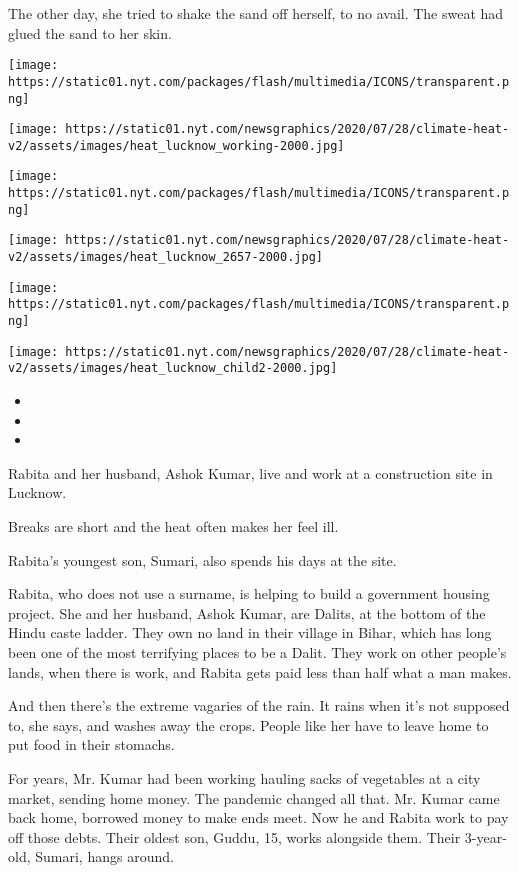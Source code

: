 The other day, she tried to shake the sand off herself, to no avail. The
sweat had glued the sand to her skin.

\texttt{[image: https://static01.nyt.com/packages/flash/multimedia/ICONS/transparent.png]}

\texttt{[image: https://static01.nyt.com/newsgraphics/2020/07/28/climate-heat-v2/assets/images/heat\_lucknow\_working-2000.jpg]}

\texttt{[image: https://static01.nyt.com/packages/flash/multimedia/ICONS/transparent.png]}

\texttt{[image: https://static01.nyt.com/newsgraphics/2020/07/28/climate-heat-v2/assets/images/heat\_lucknow\_2657-2000.jpg]}

\texttt{[image: https://static01.nyt.com/packages/flash/multimedia/ICONS/transparent.png]}

\texttt{[image: https://static01.nyt.com/newsgraphics/2020/07/28/climate-heat-v2/assets/images/heat\_lucknow\_child2-2000.jpg]}

\begin{itemize}
\item
\item
\item
\end{itemize}

Rabita and her husband, Ashok Kumar, live and work at a construction
site in Lucknow.

Breaks are short and the heat often makes her feel ill.

Rabita's youngest son, Sumari, also spends his days at the site.

Rabita, who does not use a surname, is helping to build a government
housing project. She and her husband, Ashok Kumar, are Dalits, at the
bottom of the Hindu caste ladder. They own no land in their village in
Bihar, which has long been one of the most terrifying places to be a
Dalit. They work on other people's lands, when there is work, and Rabita
gets paid less than half what a man makes.

And then there's the extreme vagaries of the rain. It rains when it's
not supposed to, she says, and washes away the crops. People like her
have to leave home to put food in their stomachs.

For years, Mr. Kumar had been working hauling sacks of vegetables at a
city market, sending home money. The pandemic changed all that. Mr.
Kumar came back home, borrowed money to make ends meet. Now he and
Rabita work to pay off those debts. Their oldest son, Guddu, 15, works
alongside them. Their 3-year-old, Sumari, hangs around.

